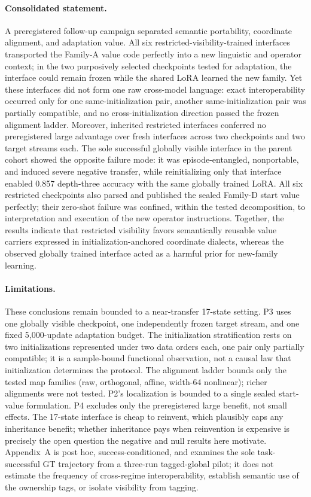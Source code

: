 \documentclass[11pt]{article}
\begin{document}
\paragraph{Consolidated statement.} A preregistered follow-up campaign separated semantic portability, coordinate alignment, and adaptation value. All six restricted-visibility-trained interfaces transported the Family-A value code perfectly into a new linguistic and operator context; in the two purposively selected checkpoints tested for adaptation, the interface could remain frozen while the shared LoRA learned the new family. Yet these interfaces did not form one raw cross-model language: exact interoperability occurred only for one same-initialization pair, another same-initialization pair was partially compatible, and no cross-initialization direction passed the frozen alignment ladder. Moreover, inherited restricted interfaces conferred no preregistered large advantage over fresh interfaces across two checkpoints and two target streams each. The sole successful globally visible interface in the parent cohort showed the opposite failure mode: it was episode-entangled, nonportable, and induced severe negative transfer, while reinitializing only that interface enabled 0.857 depth-three accuracy with the same globally trained LoRA. All six restricted checkpoints also parsed and published the sealed Family-D start value perfectly; their zero-shot failure was confined, within the tested decomposition, to interpretation and execution of the new operator instructions. Together, the results indicate that restricted visibility favors semantically reusable value carriers expressed in initialization-anchored coordinate dialects, whereas the observed globally trained interface acted as a harmful prior for new-family learning.

\paragraph{Limitations.} These conclusions remain bounded to a near-transfer 17-state setting. P3 uses one globally visible checkpoint, one independently frozen target stream, and one fixed 5{,}000-update adaptation budget. The initialization stratification rests on two initializations represented under two data orders each, one pair only partially compatible; it is a sample-bound functional observation, not a causal law that initialization determines the protocol. The alignment ladder bounds only the tested map families (raw, orthogonal, affine, width-64 nonlinear); richer alignments were not tested. P2's localization is bounded to a single sealed start-value formulation. P4 excludes only the preregistered large benefit, not small effects. The 17-state interface is cheap to reinvent, which plausibly caps any inheritance benefit; whether inheritance pays when reinvention is expensive is precisely the open question the negative and null results here motivate. Appendix~A is post hoc, success-conditioned, and examines the sole task-successful GT trajectory from a three-run tagged-global pilot; it does not estimate the frequency of cross-regime interoperability, establish semantic use of the ownership tags, or isolate visibility from tagging.
\end{document}
